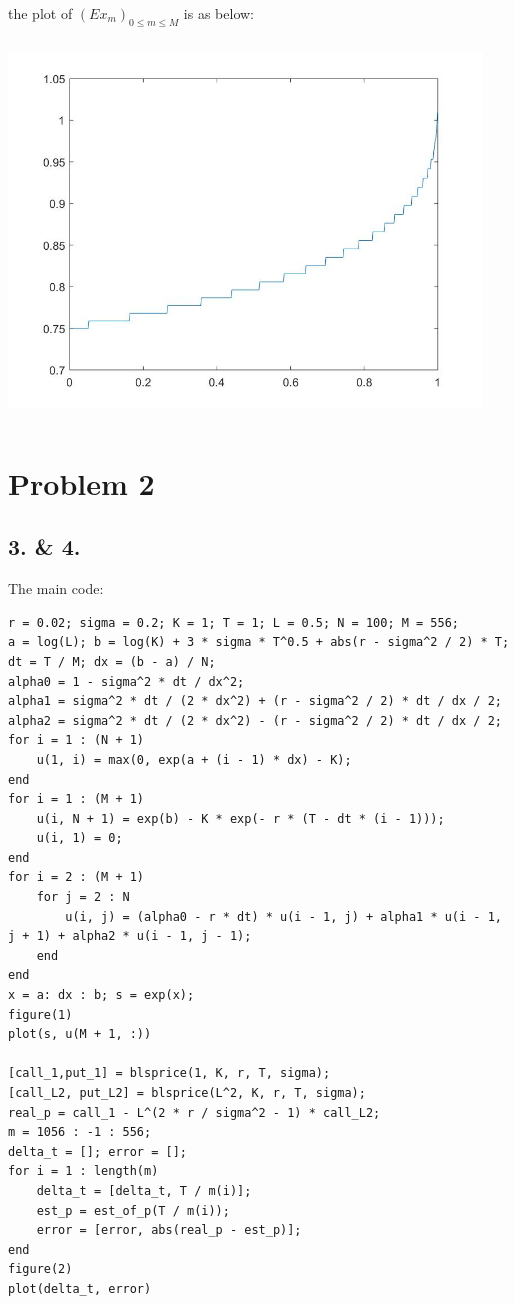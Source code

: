 \documentclass[letterpaper,11pt]{article}
\begin{document}
\begin{spacing}{1.2}
the plot of $(Ex_m)_{0 \leq m \leq M}$ is as below:

\includegraphics[width=4.95in,height=3.95in]{problem1_5.jpg}

\section*{Problem 2}
\subsection*{3. \& 4.}
The main code:
\begin{lstlisting}
r = 0.02; sigma = 0.2; K = 1; T = 1; L = 0.5; N = 100; M = 556;
a = log(L); b = log(K) + 3 * sigma * T^0.5 + abs(r - sigma^2 / 2) * T;
dt = T / M; dx = (b - a) / N;
alpha0 = 1 - sigma^2 * dt / dx^2;
alpha1 = sigma^2 * dt / (2 * dx^2) + (r - sigma^2 / 2) * dt / dx / 2;
alpha2 = sigma^2 * dt / (2 * dx^2) - (r - sigma^2 / 2) * dt / dx / 2;
for i = 1 : (N + 1)
    u(1, i) = max(0, exp(a + (i - 1) * dx) - K);
end
for i = 1 : (M + 1)
    u(i, N + 1) = exp(b) - K * exp(- r * (T - dt * (i - 1)));
    u(i, 1) = 0;
end
for i = 2 : (M + 1)
    for j = 2 : N
        u(i, j) = (alpha0 - r * dt) * u(i - 1, j) + alpha1 * u(i - 1, j + 1) + alpha2 * u(i - 1, j - 1);
    end
end
x = a: dx : b; s = exp(x);
figure(1)
plot(s, u(M + 1, :))

[call_1,put_1] = blsprice(1, K, r, T, sigma);
[call_L2, put_L2] = blsprice(L^2, K, r, T, sigma);
real_p = call_1 - L^(2 * r / sigma^2 - 1) * call_L2;
m = 1056 : -1 : 556;
delta_t = []; error = [];
for i = 1 : length(m)
    delta_t = [delta_t, T / m(i)];
    est_p = est_of_p(T / m(i));
    error = [error, abs(real_p - est_p)];
end
figure(2)
plot(delta_t, error)
\end{lstlisting}


\end{spacing}
\end{document}

